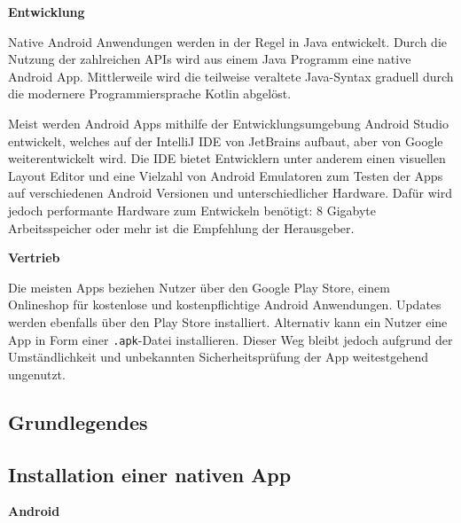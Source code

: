 \textbf{Entwicklung}


Native Android Anwendungen werden in der Regel in Java entwickelt. Durch die Nutzung der zahlreichen APIs wird aus einem Java Programm eine native Android App.
\cite[S. 1]{JavaForAndroid}
Mittlerweile wird die teilweise veraltete Java-Syntax graduell durch die modernere Programmiersprache Kotlin abgelöst.
\cite{KotlinAndroid}




Meist werden Android Apps mithilfe der Entwicklungsumgebung Android Studio entwickelt, welches auf der IntelliJ IDE von JetBrains aufbaut, aber von Google weiterentwickelt wird. Die IDE bietet Entwicklern unter anderem einen visuellen Layout Editor und eine Vielzahl von Android Emulatoren zum Testen der Apps auf verschiedenen Android Versionen und unterschiedlicher Hardware. Dafür wird jedoch performante Hardware zum Entwickeln benötigt: 8 Gigabyte Arbeitsspeicher oder mehr ist die Empfehlung der Herausgeber. \cite{AndroidStudio}

\textbf{Vertrieb}

Die meisten Apps beziehen Nutzer über den Google Play Store, einem Onlineshop für kostenlose und kostenpflichtige Android Anwendungen. 
Updates werden ebenfalls über den Play Store installiert. Alternativ kann ein Nutzer eine App in Form einer \texttt{.apk}-Datei installieren. Dieser Weg bleibt jedoch aufgrund der Umständlichkeit und unbekannten Sicherheitsprüfung der App weitestgehend ungenutzt.

\subsection{Grundlegendes}


\subsection{Installation einer nativen App}
\textbf{Android}\\